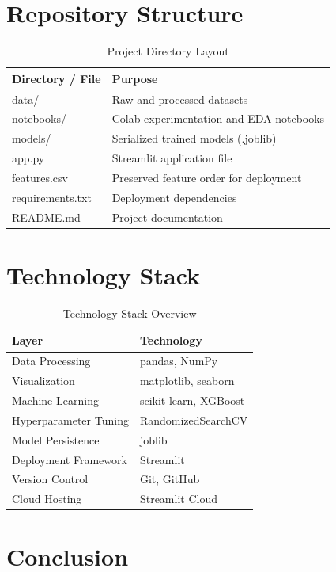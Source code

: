 \documentclass[12pt, a4paper]{article}
\begin{document}
\section{Repository Structure}

\begin{table}[H]
\centering
\caption{Project Directory Layout}
\begin{tabularx}{\textwidth}{lX}
\toprule
\textbf{Directory / File} & \textbf{Purpose} \\
\midrule
data/ & Raw and processed datasets \\
notebooks/ & Colab experimentation and EDA notebooks \\
models/ & Serialized trained models (.joblib) \\
app.py & Streamlit application file \\
features.csv & Preserved feature order for deployment \\
requirements.txt & Deployment dependencies \\
README.md & Project documentation \\
\bottomrule
\end{tabularx}
\end{table}
\newpage
\section{Technology Stack}

\begin{table}[H]
\centering
\caption{Technology Stack Overview}
\begin{tabular}{ll}
\toprule
\textbf{Layer} & \textbf{Technology} \\
\midrule
Data Processing & pandas, NumPy \\
Visualization & matplotlib, seaborn \\
Machine Learning & scikit-learn, XGBoost \\
Hyperparameter Tuning & RandomizedSearchCV \\
Model Persistence & joblib \\
Deployment Framework & Streamlit \\
Version Control & Git, GitHub \\
Cloud Hosting & Streamlit Cloud \\
\bottomrule
\end{tabular}
\end{table}
\section{Conclusion}
\end{document}
